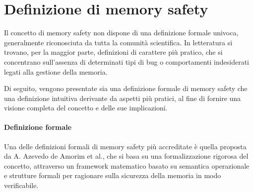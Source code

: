 \section{Definizione di memory safety}
\label{sec:memory_safety}

Il concetto di memory safety non dispone di una definizione formale univoca,
generalmente riconosciuta da tutta la comunità scientifica. In letteratura si trovano,
per la maggior parte, definizioni di carattere più pratico, che si concentrano
sull'assenza di determinati tipi di bug o comportamenti indesiderati legati alla
gestione della memoria.

Di seguito, vengono presentate sia una definizione formale di memory safety che una
definizione intuitiva derivante da aspetti più pratici, al fine di fornire una
visione completa del concetto e delle sue implicazioni.

\paragraph{Definizione formale}

Una delle definizioni formali di memory safety più accreditate è quella proposta
da A. Azevedo de Amorim et al.\cite{meaning_memory_safety}, che si basa su una
formalizzazione rigorosa del concetto, attraverso un framework matematico basato
su semantica operazionale e strutture formali per ragionare sulla sicurezza della
memoria in modo verificabile.

